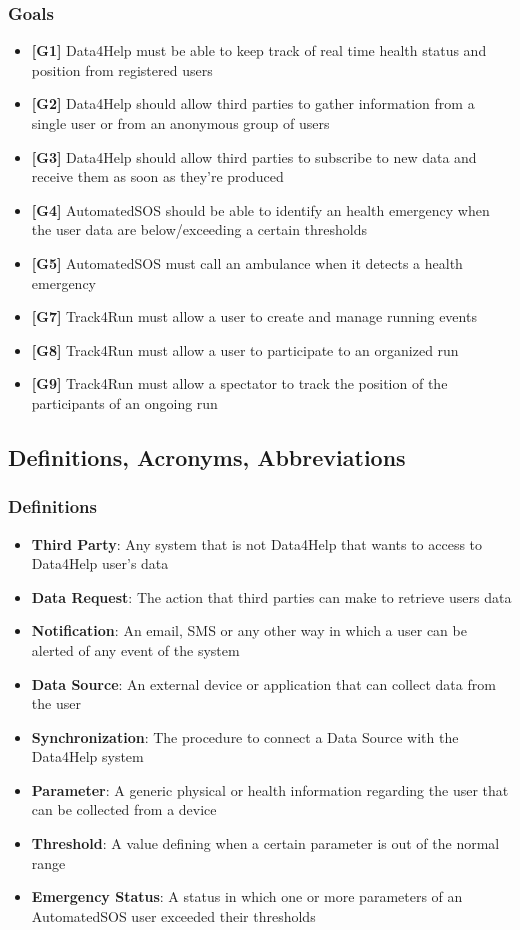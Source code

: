 \subsubsection{Goals}
\begin{itemize}
\item \textbf{[G1]} Data4Help must be able to keep track of real time health status and position from registered users
\item \textbf{[G2]} Data4Help should allow third parties to gather information from a single user or from an anonymous group of users
\item \textbf{[G3]} Data4Help should allow third parties to subscribe to new data and receive them as soon as they're produced
\item \textbf{[G4]} AutomatedSOS should be able to identify an health emergency when the user data are below/exceeding a certain thresholds
\item \textbf{[G5]} AutomatedSOS must call an ambulance when it detects a health emergency
\item \textbf{[G7]} Track4Run must allow a user to create and manage running events
\item \textbf{[G8]} Track4Run must allow a user to participate to an organized run
\item \textbf{[G9]} Track4Run must allow a spectator to track the position of the participants of an ongoing run 
\end{itemize}
\subsection{Definitions, Acronyms, Abbreviations}
\subsubsection{Definitions}

\begin{itemize}
\item \textbf{Third Party}: Any system that is not Data4Help that wants to access to Data4Help user's data
\item \textbf{Data Request}: The action that third parties can make to retrieve users data
\item \textbf{Notification}: An email, SMS or any other way in which a user can be alerted of any event of the system
\item \textbf{Data Source}: An external device or application that can collect data from the user
\item \textbf{Synchronization}: The procedure to connect a Data Source with the Data4Help system
\item \textbf{Parameter}: A generic physical or health information regarding the user that can be collected from a device
\item \textbf{Threshold}: A value defining when a certain parameter is out of the normal range
\item \textbf{Emergency Status}: A status in which one or more parameters of an AutomatedSOS user exceeded their thresholds
\end{itemize}

